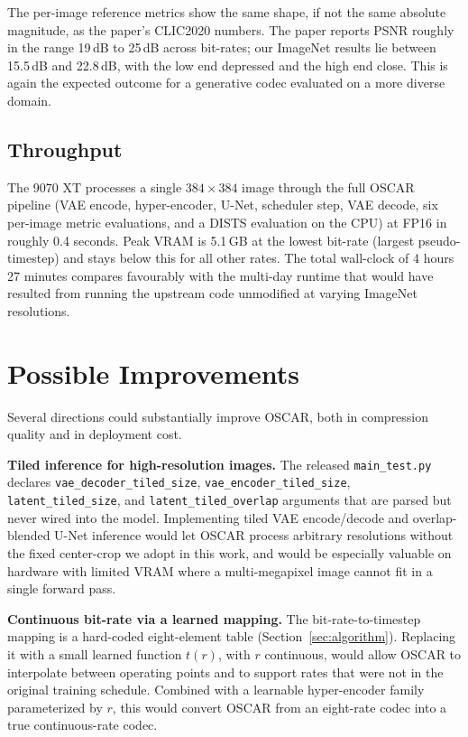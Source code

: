\documentclass[conference]{IEEEtran}
\begin{document}
The per-image reference metrics show the same shape, if not the same
absolute magnitude, as the paper's CLIC2020 numbers. The paper reports
PSNR roughly in the range 19\,dB to 25\,dB across bit-rates; our ImageNet
results lie between 15.5\,dB and 22.8\,dB, with the low end depressed and
the high end close. This is again the expected outcome for a generative
codec evaluated on a more diverse domain.

\subsection{Throughput}

The 9070 XT processes a single $384 \times 384$ image through the full
OSCAR pipeline (VAE encode, hyper-encoder, U-Net, scheduler step, VAE
decode, six per-image metric evaluations, and a DISTS evaluation on the
CPU) at FP16 in roughly 0.4 seconds. Peak VRAM is 5.1\,GB at the lowest
bit-rate (largest pseudo-timestep) and stays below this for all other
rates. The total wall-clock of 4 hours 27 minutes compares favourably
with the multi-day runtime that would have resulted from running the
upstream code unmodified at varying ImageNet resolutions.

\section{Possible Improvements}
\label{sec:improvements}

Several directions could substantially improve OSCAR, both in compression
quality and in deployment cost.

\textbf{Tiled inference for high-resolution images.} The released
\texttt{main\_test.py} declares \texttt{vae\_decoder\_tiled\_size},
\texttt{vae\_encoder\_tiled\_size}, \texttt{latent\_tiled\_size}, and
\texttt{latent\_tiled\_overlap} arguments that are parsed but never wired
into the model. Implementing tiled VAE encode/decode and overlap-blended
U-Net inference would let OSCAR process arbitrary resolutions without the
fixed center-crop we adopt in this work, and would be especially valuable
on hardware with limited VRAM where a multi-megapixel image cannot fit in
a single forward pass.

\textbf{Continuous bit-rate via a learned mapping.} The bit-rate-to-timestep
mapping is a hard-coded eight-element table (Section~\ref{sec:algorithm}).
Replacing it with a small learned function $t(r)$, with $r$ continuous,
would allow OSCAR to interpolate between operating points and to support
rates that were not in the original training schedule. Combined with a
learnable hyper-encoder family parameterized by $r$, this would convert
OSCAR from an eight-rate codec into a true continuous-rate codec.
\end{document}
